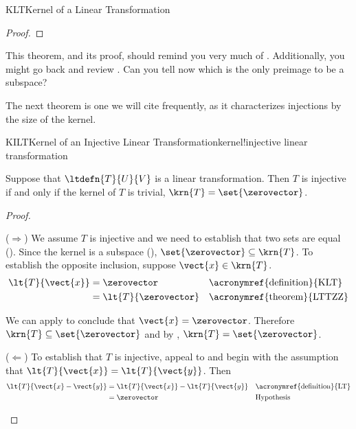 \begin{subsect}{KLT}{Kernel of a Linear Transformation}
\begin{proof}
%
\end{proof}
%
\begin{para}This theorem, and its proof, should remind you very much of .  Additionally, you might go back and review .  Can you tell now which is the only preimage to be a subspace?\end{para}
%
\begin{para}The next theorem is one we will cite frequently, as it characterizes injections by the size of the kernel.\end{para}
%
\begin{theorem}{KILT}{Kernel of an Injective Linear Transformation}{kernel!injective linear transformation}
\begin{para}Suppose that $\ltdefn{T}{U}{V}$ is a linear transformation.  Then $T$ is injective if and only if the kernel of $T$ is trivial, $\krn{T}=\set{\zerovector}$.\end{para}
\end{theorem}
%
\begin{proof}
\begin{para}($\Rightarrow$) We assume $T$ is injective and we need to establish that two sets are equal ().  Since the kernel is a subspace (), $\set{\zerovector}\subseteq\krn{T}$.  To establish the opposite inclusion, suppose $\vect{x}\in\krn{T}$.
%
\begin{align*}
\lt{T}{\vect{x}}
&=\zerovector&&\text{\acronymref{definition}{KLT}}\\
%
&=\lt{T}{\zerovector}
&&\text{\acronymref{theorem}{LTTZZ}}
%
\end{align*}
\end{para}
%
\begin{para}We can apply  to conclude that $\vect{x}=\zerovector$.  Therefore $\krn{T}\subseteq\set{\zerovector}$ and by , $\krn{T}=\set{\zerovector}$.\end{para}
%
\begin{para}($\Leftarrow$)  To establish that $T$ is injective, appeal to  and begin with the assumption that $\lt{T}{\vect{x}}=\lt{T}{\vect{y}}$.  Then
%
\begin{align*}
\lt{T}{\vect{x}-\vect{y}}
&=\lt{T}{\vect{x}}-\lt{T}{\vect{y}}
&&\text{\acronymref{definition}{LT}}\\
%
&=\zerovector
&&\text{Hypothesis}
%
\end{align*}

\end{para}
\end{proof}
\end{subsect}
